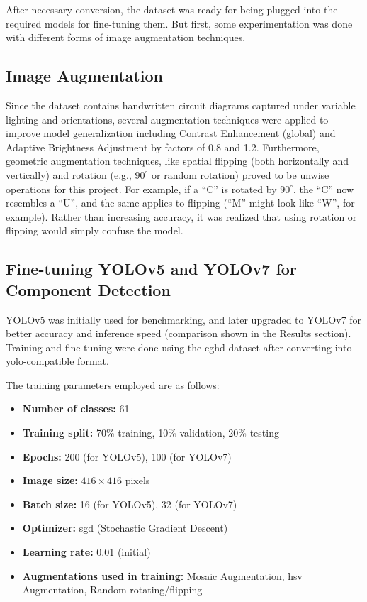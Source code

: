 After necessary conversion, the dataset was ready for being plugged into the required models for fine-tuning them. But first, some experimentation was done with different forms of image augmentation techniques.

\subsection{Image Augmentation}

Since the dataset contains handwritten circuit diagrams captured under variable lighting and orientations, several augmentation techniques were applied to improve model generalization including Contrast Enhancement (global) and Adaptive Brightness Adjustment by factors of 0.8 and 1.2. Furthermore, geometric augmentation techniques, like spatial flipping (both horizontally and vertically) and rotation (e.g., $90^\circ$ or random rotation) proved to be unwise operations for this project. For example, if a ``C'' is rotated by $90^\circ$, the ``C'' now resembles a ``U'', and the same applies to flipping (``M'' might look like ``W'', for example). Rather than increasing accuracy, it was realized that using rotation or flipping would simply confuse the model. 

\subsection{Fine-tuning YOLOv5 and YOLOv7 for Component Detection}

YOLOv5 was initially used for benchmarking, and later upgraded to YOLOv7 for better accuracy and inference speed (comparison shown in the Results section). Training and fine-tuning were done using the \gls{cghd} dataset after converting into \gls{yolo}-compatible format.

The training parameters employed are as follows:

\begin{itemize}
    \item \textbf{Number of classes:} 61
    \item \textbf{Training split:} 70\% training, 10\% validation, 20\% testing
    \item \textbf{Epochs:} 200 (for YOLOv5), 100 (for YOLOv7)
    \item \textbf{Image size:} $416 \times 416$ pixels
    \item \textbf{Batch size:} 16 (for YOLOv5), 32 (for YOLOv7)
    \item \textbf{Optimizer:} \gls{sgd} (Stochastic Gradient Descent)
    \item \textbf{Learning rate:} 0.01 (initial)
    \item \textbf{Augmentations used in training:} Mosaic Augmentation, \gls{hsv} Augmentation, Random rotating/flipping
\end{itemize}


